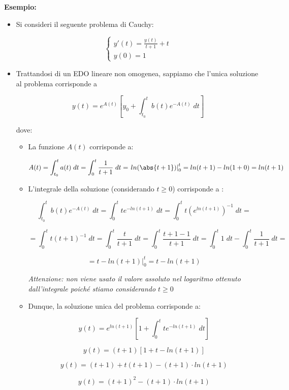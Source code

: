 \documentclass[a4paper, 12pt]{report}
\begin{document}
    \textbf{Esempio:}
    \begin{itemize}
        \item Si consideri il seguente problema di Cauchy:
        
        $$
        \left \{ \begin{array}{l}
            y'(t) = \frac{y(t)}{t+1} + t\\
            y(0) = 1
        \end{array}\right .
        $$
        
        \item Trattandosi di un EDO lineare non omogenea, sappiamo che l'unica soluzione al problema corrisponde a
        
        \[ y(t) = e^{A(t)} \left [ y_0 + \int_{t_0}^{t} b(t)e^{-A(t)} \; dt \right ] \]
        
        dove:
        
        \begin{itemize}
            \item La funzione $A(t)$ corrisponde a:
            
            \[ A(t) = \int_{t_0}^{t} a(t) \; dt = \int_{0}^{t} \frac{1}{t+1} \; dt = \left . ln(\abs{t+1}) \right |_{0}^{t} = ln(t+1) - ln(1+0) = ln(t+1)\]
            
            \item L'integrale della soluzione (considerando $t \geq 0$) corrisponde a :
            
            \[ \int_{t_0}^{t} b(t)e^{-A(t)} \; dt = \int_{0}^{t} te^{-ln(t+1)} \; dt = \int_{0}^{t} t \left (e^{ln(t+1)} \right )^{-1} \; dt = \]
            
            \[ = \int_{0}^{t} t (t+1)^{-1} \; dt = \int_{0}^{t} \frac{t}{t+1}\; dt = \int_{0}^{t} \frac{t+1-1}{t+1}\; dt = \int_{0}^{t} 1 \; dt - \int_{0}^{t} \frac{1}{t+1}\; dt = \]
            
            \[ = \left . t - ln(t+1) \right |_{0}^{t} = t - ln(t+1)\]
            
            \textit{Attenzione: non viene usato il valore assoluto nel logaritmo ottenuto dall'integrale poiché stiamo considerando $t \geq 0$}
            
            \item Dunque, la soluzione unica del problema corrisponde a:
            
            \[ y(t) = e^{ln(t+1)} \left [ 1 + \int_{0}^{t} te^{-ln(t+1)} \; dt \right ] \]
            
            \[ y(t) = (t+1) \left [ 1 + t - ln(t+1) \right ] \]
            
            \[ y(t) = (t+1) + t(t+1) - (t+1) \cdot ln(t+1)\]
            
            \[ y(t) = (t+1)^2 - (t+1) \cdot ln(t+1)\]
        \end{itemize}
    \end{itemize}
    
\end{document}
